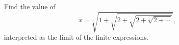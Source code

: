 Find the value of
\[
x=\sqrt{1+\sqrt{2+\sqrt{2+\sqrt{2+\cdots}}}},
\]
interpreted as the limit of the finite expressions.
